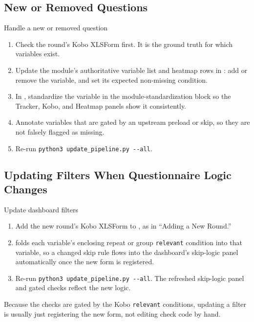 \subsection{New or Removed Questions}

\begin{procbox}{Handle a new or removed question}
\begin{enumerate}
  \item Check the round's Kobo XLSForm first. It is the ground truth for which variables exist.
  \item Update the module's authoritative variable list and heatmap rows in : add or remove the variable, and set its expected non-missing condition.
  \item In , standardize the variable in the module-standardization block so the Tracker, Kobo, and Heatmap panels show it consistently.
  \item Annotate variables that are gated by an upstream preload or skip, so they are not falsely flagged as missing.
  \item Re-run \texttt{python3 update\_pipeline.py -{}-all}.
\end{enumerate}
\end{procbox}

\subsection{Updating Filters When Questionnaire Logic Changes}

\begin{procbox}{Update dashboard filters}
\begin{enumerate}
  \item Add the new round's Kobo XLSForm to , as in ``Adding a New Round.''
  \item {} folds each variable's enclosing repeat or group \texttt{relevant} condition into that variable, so a changed skip rule flows into the dashboard's skip-logic panel automatically once the new form is registered.
  \item Re-run \texttt{python3 update\_pipeline.py -{}-all}. The refreshed skip-logic panel and gated checks reflect the new logic.
\end{enumerate}
\end{procbox}

Because the checks are gated by the Kobo \texttt{relevant} conditions, updating a filter is usually just registering the new form, not editing check code by hand.
